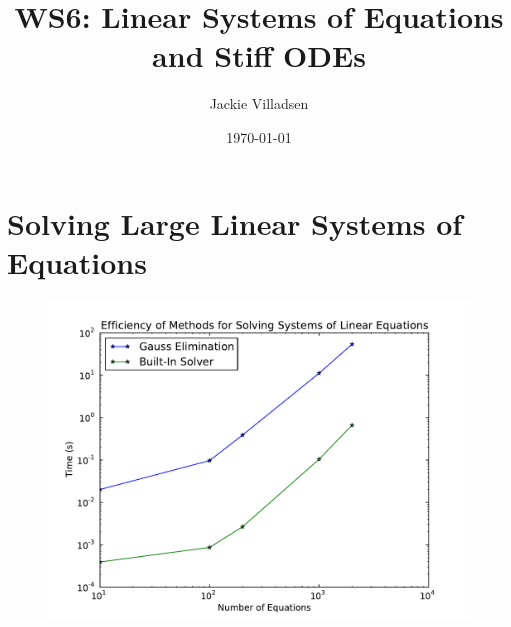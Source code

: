 \documentclass{article}
\begin{document}
\title{WS6: Linear Systems of Equations and Stiff ODEs}
\author{Jackie Villadsen}
\date{\today}
\maketitle


\section{Solving Large Linear Systems of Equations}

\begin{figure}[h]
  \begin{center}
     \includegraphics[width=\textwidth]{linsystimes}
  \end{center}
  \label{fig:times}
\end{figure}
\end{document}
